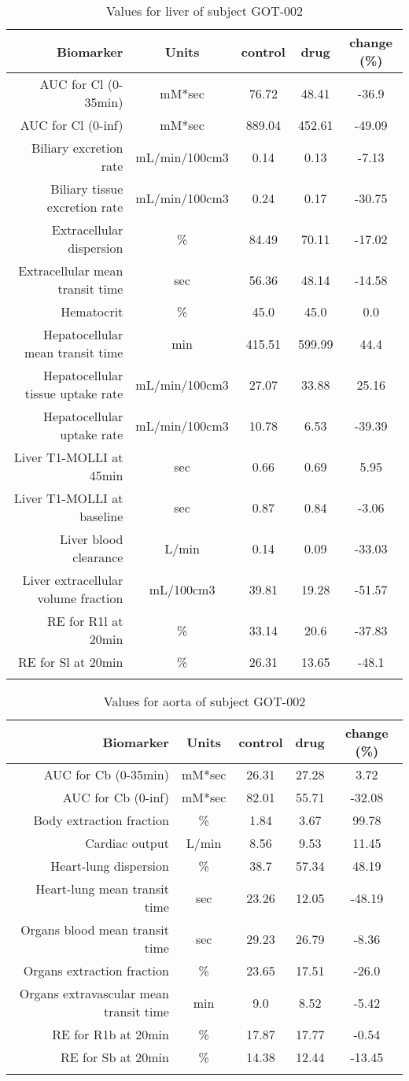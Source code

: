 \documentclass{epflreport}%
\begin{document}
%
\clearpage%
\begin{longtable}{rcccc}%
\hline%
Biomarker&Units&control&drug&change (\%)\\%
\hline%
AUC for Cl (0{-}35min)&mM*sec&76.72&48.41&{-}36.9\\%
AUC for Cl (0{-}inf)&mM*sec&889.04&452.61&{-}49.09\\%
Biliary excretion rate&mL/min/100cm3&0.14&0.13&{-}7.13\\%
Biliary tissue excretion rate&mL/min/100cm3&0.24&0.17&{-}30.75\\%
Extracellular dispersion&\%&84.49&70.11&{-}17.02\\%
Extracellular mean transit time&sec&56.36&48.14&{-}14.58\\%
Hematocrit&\%&45.0&45.0&0.0\\%
Hepatocellular mean transit time&min&415.51&599.99&44.4\\%
Hepatocellular tissue uptake rate&mL/min/100cm3&27.07&33.88&25.16\\%
Hepatocellular uptake rate&mL/min/100cm3&10.78&6.53&{-}39.39\\%
Liver T1{-}MOLLI at 45min&sec&0.66&0.69&5.95\\%
Liver T1{-}MOLLI at baseline&sec&0.87&0.84&{-}3.06\\%
Liver blood clearance&L/min&0.14&0.09&{-}33.03\\%
Liver extracellular volume fraction&mL/100cm3&39.81&19.28&{-}51.57\\%
RE for R1l at 20min&\%&33.14&20.6&{-}37.83\\%
RE for Sl at 20min&\%&26.31&13.65&{-}48.1\\%
\hline%
\caption{Values for liver of subject GOT-002} \\%
\end{longtable}%
\begin{longtable}{rcccc}%
\hline%
Biomarker&Units&control&drug&change (\%)\\%
\hline%
AUC for Cb (0{-}35min)&mM*sec&26.31&27.28&3.72\\%
AUC for Cb (0{-}inf)&mM*sec&82.01&55.71&{-}32.08\\%
Body extraction fraction&\%&1.84&3.67&99.78\\%
Cardiac output&L/min&8.56&9.53&11.45\\%
Heart{-}lung dispersion&\%&38.7&57.34&48.19\\%
Heart{-}lung mean transit time&sec&23.26&12.05&{-}48.19\\%
Organs blood mean transit time&sec&29.23&26.79&{-}8.36\\%
Organs extraction fraction&\%&23.65&17.51&{-}26.0\\%
Organs extravascular mean transit time&min&9.0&8.52&{-}5.42\\%
RE for R1b at 20min&\%&17.87&17.77&{-}0.54\\%
RE for Sb at 20min&\%&14.38&12.44&{-}13.45\\%
\hline%
\caption{Values for aorta of subject GOT-002} \\%
\end{longtable}%
\clearpage%
\end{document}
